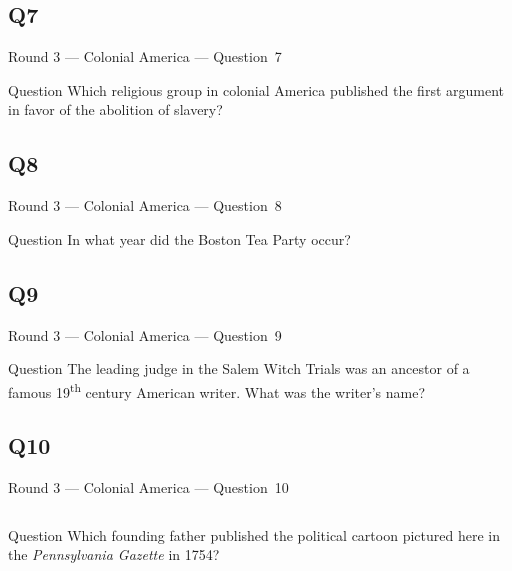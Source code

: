 \documentclass[11pt]{beamer}
\begin{document}
\subsection*{Q7}
\begin{frame}[t]{Round 3 --- Colonial America --- \mbox{Question 7}}
    \vspace{-0.5em}
    \begin{block}{Question}
        Which religious group in colonial America published the first argument in favor of the abolition of slavery?
    \end{block}
\end{frame}
\subsection*{Q8}
\begin{frame}[t]{Round 3 --- Colonial America --- \mbox{Question 8}}
    \vspace{-0.5em}
    \begin{block}{Question}
        In what year did the Boston Tea Party occur?
    \end{block}
\end{frame}
\subsection*{Q9}
\begin{frame}[t]{Round 3 --- Colonial America --- \mbox{Question 9}}
    \vspace{-0.5em}
    \begin{block}{Question}
        The leading judge in the Salem Witch Trials was an ancestor of a famous 19\textsuperscript{th} century American writer. What was the writer's name?
    \end{block}
\end{frame}
\subsection*{Q10}
\begin{frame}[t]{Round 3 --- Colonial America --- \mbox{Question 10}}
    \vspace{-0.5em}
    \begin{columns}[T,totalwidth=\linewidth]
        \begin{column}{0.32\linewidth}
            \begin{block}{Question}
                Which founding father published the political cartoon pictured here in the \emph{Pennsylvania Gazette} in 1754?
            \end{block}
        \end{column}
        \begin{column}{0.65\linewidth}
            \begin{center}
                \texttt{[image: \{Images/joinordie]}.jpg}
            \end{center}
        \end{column}
    \end{columns}
\end{frame}
\end{document}
